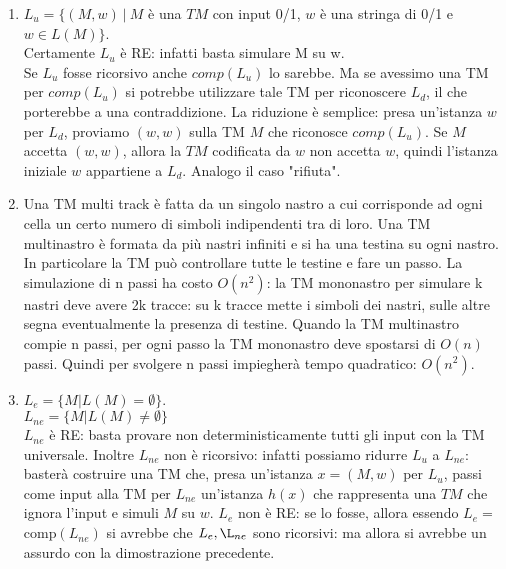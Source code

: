 \documentclass[a4paper,11pt]{article}
\begin{document}
\begin{enumerate}
     \item $L_u = \{ (M,w)\ | \ M$ è una $TM$ con input 0/1, $w$ è una stringa di 0/1 e $w \in L(M)\}$.\\Certamente $L_u$ è RE: infatti basta simulare M su w.
     \\Se $L_u$ fosse ricorsivo anche $comp(L_u)$ lo sarebbe. Ma se avessimo una TM per $comp(L_u)$ si potrebbe utilizzare tale TM per riconoscere $L_d$, il che porterebbe a una contraddizione. La riduzione è semplice: presa un'istanza $w$ per $L_d$, proviamo $(w,w)$ sulla TM $M$ che riconosce $comp(L_u)$. Se $M$ accetta $(w,w)$, allora la $TM$ codificata da $w$ non accetta $w$, quindi l'istanza iniziale $w$ appartiene a $L_d$. Analogo il caso "rifiuta".
     \item Una TM multi track è fatta da un singolo nastro a cui corrisponde ad ogni cella un certo numero di simboli indipendenti tra di loro. Una TM multinastro è formata da più nastri infiniti e si ha una testina su ogni nastro. In particolare la TM può controllare tutte le testine e fare un passo. La simulazione di n passi ha costo $O(n^2)$: la TM mononastro per simulare k nastri deve avere 2k tracce: su k tracce mette i simboli dei nastri, sulle altre segna eventualmente la presenza di testine. Quando la TM multinastro compie n passi, per ogni passo la TM mononastro deve spostarsi di $O(n)$ passi. Quindi per svolgere n passi impiegherà tempo quadratico: $O(n^2)$.
     \item $L_e = \{M|L(M)=\emptyset\}$.\\
     $L_{ne} = \{M|L(M)\neq \emptyset\}$\\
     $L_{ne}$ è RE: basta provare non deterministicamente tutti gli input con la TM universale. Inoltre $L_{ne}$ non è ricorsivo: infatti possiamo ridurre $L_u$ a $L_{ne}$: basterà costruire una TM che, presa un'istanza $x=(M,w)$ per $L_u$, passi come input alla TM per $L_{ne}$ un'istanza $h(x)$ che rappresenta una $TM$ che ignora l'input e simuli $M$ su $w$. $L_e$ non è RE: se lo fosse, allora essendo $L_e=$comp$(L_{ne})$ si avrebbe che $L_e, \L_{ne}$ sono ricorsivi: ma allora si avrebbe un assurdo con la dimostrazione precedente.
    
\end{enumerate}
\end{document}
